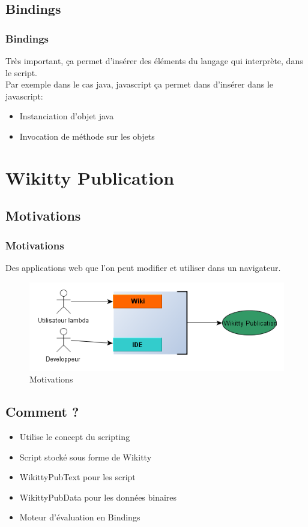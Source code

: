 \documentclass[12pt,a4paper,utf8x]{beamer}
\begin{document}
\subsection*{Bindings}
\begin{frame}\frametitle{Bindings}
Très important, ça permet d'insérer des éléments du langage qui interprète, dans le script.\\
\vspace{5mm}
Par exemple dans le cas java, javascript ça permet dans d'insérer dans le javascript:
\begin{itemize}
\item Instanciation d'objet java
\item Invocation de méthode sur les objets
\end{itemize}
\end{frame}


\section{Wikitty Publication} 
\subsection*{Motivations}
\begin{frame}\frametitle{Motivations}

Des applications web que l'on peut modifier et utiliser dans un navigateur.\pause


\begin{figure}\pause
\includegraphics[scale=0.5]{../image/wpwhy.png} 
\caption{Motivations}
\end{figure}

\end{frame}

\subsection*{Comment ?}
\begin{frame} 
\begin{itemize}
\item Utilise le concept du scripting
\item Script stocké sous forme de Wikitty
\item WikittyPubText pour les script
\item WikittyPubData pour les données binaires
\item Moteur d'évaluation en Bindings
\end{itemize}

\end{frame}
\end{document}
